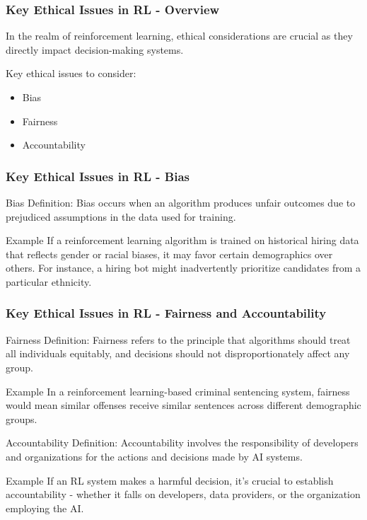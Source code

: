 \documentclass{beamer}
\begin{document}
\begin{frame}[fragile]
    \frametitle{Key Ethical Issues in RL - Overview}
    In the realm of reinforcement learning, ethical considerations are crucial as they directly impact decision-making systems.
    
    Key ethical issues to consider:
    \begin{itemize}
        \item Bias
        \item Fairness
        \item Accountability
    \end{itemize}
\end{frame}

\begin{frame}[fragile]
    \frametitle{Key Ethical Issues in RL - Bias}
    \begin{block}{Bias}
        Definition: Bias occurs when an algorithm produces unfair outcomes due to prejudiced assumptions in the data used for training.
    \end{block}
    \begin{exampleblock}{Example}
        If a reinforcement learning algorithm is trained on historical hiring data that reflects gender or racial biases, it may favor certain demographics over others. For instance, a hiring bot might inadvertently prioritize candidates from a particular ethnicity.
    \end{exampleblock}
\end{frame}

\begin{frame}[fragile]
    \frametitle{Key Ethical Issues in RL - Fairness and Accountability}
    \begin{block}{Fairness}
        Definition: Fairness refers to the principle that algorithms should treat all individuals equitably, and decisions should not disproportionately affect any group.
    \end{block}
    \begin{exampleblock}{Example}
        In a reinforcement learning-based criminal sentencing system, fairness would mean similar offenses receive similar sentences across different demographic groups.
    \end{exampleblock}
    
    \begin{block}{Accountability}
        Definition: Accountability involves the responsibility of developers and organizations for the actions and decisions made by AI systems.
    \end{block}
    \begin{exampleblock}{Example}
        If an RL system makes a harmful decision, it's crucial to establish accountability - whether it falls on developers, data providers, or the organization employing the AI.
    \end{exampleblock}
\end{frame}
\end{document}
